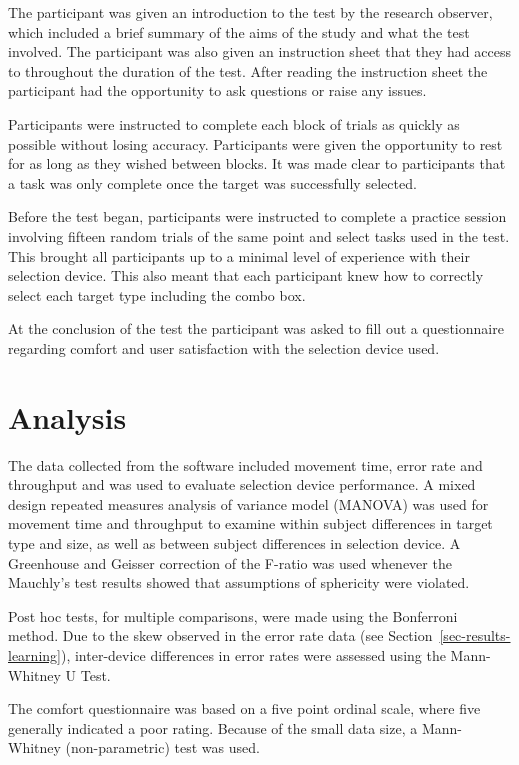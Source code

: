 \documentclass{elsart}
\begin{document}
The participant was given an introduction to the test by the research
observer, which included a brief summary of the aims of the study and
what the test involved. The participant was also given an instruction
sheet that they had access to throughout the duration of the test. After
reading the instruction sheet the participant had the opportunity to ask
questions or raise any issues.

Participants were instructed to complete each block of trials as quickly
as possible without losing accuracy. Participants were given the
opportunity to rest for as long as they wished between blocks. It was
made clear to participants that a task was only complete once the target
was successfully selected.

Before the test began, participants were instructed to complete a
practice session involving fifteen random trials of the same point and
select tasks used in the test. This brought all participants up to a
minimal level of experience with their selection device. This also meant
that each participant knew how to correctly select each target type
including the combo box.

At the conclusion of the test the participant was asked to fill out a
questionnaire regarding comfort and user satisfaction with the selection
device used.


\section{Analysis}
\label{sec-analysis}

The data collected from the software included movement time, error rate
and throughput and was used to evaluate selection device performance. A
mixed design repeated measures analysis of variance model (MANOVA) was
used for movement time and throughput to examine within subject
differences in target type and size, as well as between subject
differences in selection device. A Greenhouse and Geisser correction of
the F-ratio was used whenever the Mauchly's test results showed that
assumptions of sphericity were violated.

Post hoc tests, for multiple comparisons, were made using the Bonferroni
method. Due to the skew observed in the error rate data (see
Section~\ref{sec-results-learning}), inter-device differences in error
rates were assessed using the Mann-Whitney U Test.

The comfort questionnaire was based on a five point ordinal scale, where
five generally indicated a poor rating. Because of the small data size, a
Mann-Whitney (non-parametric) test was used.
\end{document}
